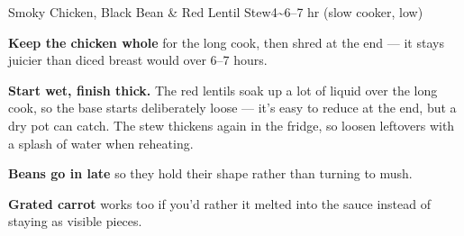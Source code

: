 \begin{recipebox}{Smoky Chicken, Black Bean \& Red Lentil Stew}{4}{\textasciitilde6--7 hr (slow cooker, low)}
\begin{notelist}
  \item \textbf{Keep the chicken whole} for the long cook, then shred at the
        end --- it stays juicier than diced breast would over 6--7 hours.
  \item \textbf{Start wet, finish thick.} The red lentils soak up a lot of
        liquid over the long cook, so the base starts deliberately loose ---
        it's easy to reduce at the end, but a dry pot can catch. The stew
        thickens again in the fridge, so loosen leftovers with a splash of
        water when reheating.
  \item \textbf{Beans go in late} so they hold their shape rather than turning
        to mush.
  \item \textbf{Grated carrot} works too if you'd rather it melted into the
        sauce instead of staying as visible pieces.
\end{notelist}

\end{recipebox}
